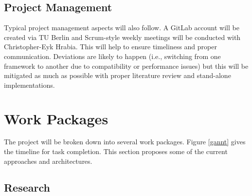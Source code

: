 

\subsection{Project Management}
Typical project management aspects will also follow. A GitLab account will be created via TU Berlin and Scrum-style weekly meetings will be conducted with Christopher-Eyk Hrabia. This will help to ensure timeliness and proper communication. Deviations are likely to happen (i.e., switching from one framework to another due to compatibility or performance issues) but this will be mitigated as much as possible with proper literature review and stand-alone implementations.


\section{Work Packages}
The project will be broken down into several work packages. Figure \ref{gannt} gives the timeline for task completion. This section proposes some of the current approaches and architectures.


\subsection{Research}

